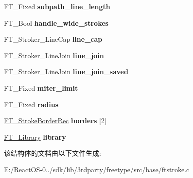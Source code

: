 \begin{DoxyCompactItemize}
\item 
\mbox{\label{struct_f_t___stroker_rec___a658b73ff2c36ddb2db3b048a46d944a2}} 
F\+T\+\_\+\+Fixed {\bfseries subpath\+\_\+line\+\_\+length}
\item 
\mbox{\label{struct_f_t___stroker_rec___a09c20d4f17b3a7da56f081d1e0a5c6e3}} 
F\+T\+\_\+\+Bool {\bfseries handle\+\_\+wide\+\_\+strokes}
\item 
\mbox{\label{struct_f_t___stroker_rec___a49f0d141f74c43d1e361925985e7ca41}} 
F\+T\+\_\+\+Stroker\+\_\+\+Line\+Cap {\bfseries line\+\_\+cap}
\item 
\mbox{\label{struct_f_t___stroker_rec___a7db150affc30eaf5fa766603820b9d47}} 
F\+T\+\_\+\+Stroker\+\_\+\+Line\+Join {\bfseries line\+\_\+join}
\item 
\mbox{\label{struct_f_t___stroker_rec___ae727022453f4c5da118af665af08df97}} 
F\+T\+\_\+\+Stroker\+\_\+\+Line\+Join {\bfseries line\+\_\+join\+\_\+saved}
\item 
\mbox{\label{struct_f_t___stroker_rec___a6c84640cb3ae6032be890b564e0d86c5}} 
F\+T\+\_\+\+Fixed {\bfseries miter\+\_\+limit}
\item 
\mbox{\label{struct_f_t___stroker_rec___a05654ee8a6638c83c733822a8c93df04}} 
F\+T\+\_\+\+Fixed {\bfseries radius}
\item 
\mbox{\label{struct_f_t___stroker_rec___ad0bc5fe6112ab4dc78f059e41604a4de}} 
\hyperlink{struct_f_t___stroke_border_rec__}{F\+T\+\_\+\+Stroke\+Border\+Rec} {\bfseries borders} \mbox{[}2\mbox{]}
\item 
\mbox{\label{struct_f_t___stroker_rec___ace57849503a1915de8d88004c65ddc26}} 
\hyperlink{struct_f_t___library_rec__}{F\+T\+\_\+\+Library} {\bfseries library}
\end{DoxyCompactItemize}


该结构体的文档由以下文件生成\+:\begin{DoxyCompactItemize}
\item 
E\+:/\+React\+O\+S-\/0../sdk/lib/3rdparty/freetype/src/base/ftstroke.\+c\end{DoxyCompactItemize}
